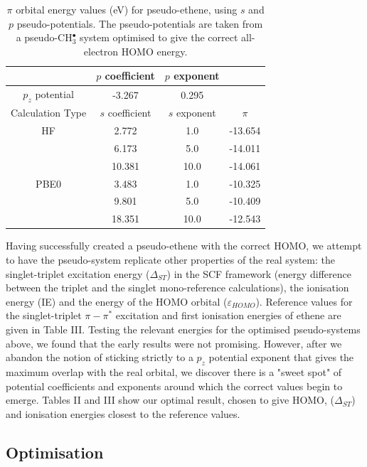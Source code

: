 \documentclass[aip]{revtex4-1}
\begin{document}
\begin{table}[ht]
\caption{\(\pi\) orbital energy values (eV) for pseudo-ethene, using \(s\) and \(p\) pseudo-potentials.
The pseudo-potentials are taken from a pseudo-CH\(^{\bullet}_{3}\) system optimised to give the correct all-electron HOMO energy.}
\label{table:p_potentials}
\begin{tabular}{c c c c}
\hline\hline
& \(p\) coefficient & \(p\) exponent \\
\hline
\(p_{z}\) potential & -3.267 & 0.295 \\
\hline
Calculation Type & \(s\) coefficient & \(s\) exponent & \(\pi\) \\
\hline
HF & 2.772 & 1.0 & -13.654 \\
 & 6.173 & 5.0 & -14.011 \\
 & 10.381 & 10.0 & -14.061 \\
\hline
PBE0 & 3.483 & 1.0 & -10.325 \\
 & 9.801 & 5.0 & -10.409 \\
 & 18.351 & 10.0 & -12.543 \\
\hline\hline
\end{tabular}
\end{table}

Having successfully created a pseudo-ethene with the correct HOMO, we attempt to have the pseudo-system replicate other properties of the real system:
the singlet-triplet excitation energy ($\Delta_{ST}$) in the SCF framework (energy difference between the triplet and the singlet mono-reference
calculations), the ionisation energy (IE) and the energy of the HOMO orbital ($\varepsilon_{HOMO}$). Reference values for the singlet-triplet \(\pi-\pi^{*}\) excitation and first ionisation energies of ethene are given in Table III. Testing the relevant energies for the optimised pseudo-systems above, we found that the early results were not promising. However, after we abandon the notion of sticking strictly to a \(p_{z}\) potential exponent that gives the maximum overlap with the real orbital, we discover there is a "sweet spot" of potential coefficients and exponents around which the correct values begin to emerge. Tables II and III show our optimal result, chosen to give HOMO, ($\Delta_{ST}$) and ionisation energies closest to the reference values. 

\subsection*{Optimisation}
\end{document}
